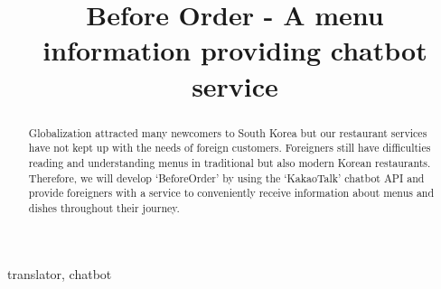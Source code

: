 \documentclass[conference]{IEEEtran}
\begin{document}
\title{Before Order - A menu information providing chatbot service}

\author{
\and
{}
\and
{}
\and
{}
}

\maketitle

\begin{abstract}
Globalization attracted many newcomers to South Korea but our restaurant services have not kept up with the needs of foreign customers. Foreigners still have difficulties reading and understanding menus in traditional but also modern Korean restaurants. Therefore, we will develop ‘BeforeOrder’ by using the ‘KakaoTalk’ chatbot API and provide foreigners with a service to conveniently receive information about menus and dishes throughout their journey.
\end{abstract}

\begin{IEEEkeywords}
translator, chatbot
\end{IEEEkeywords}



\end{document}
